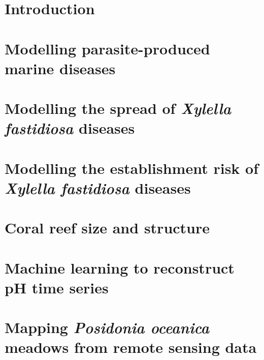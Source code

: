 \section{\label{sec:Introduction_3} Introduction}

\section{\label{sec:Modelling parasite-produced marine diseases} Modelling
  parasite-produced marine diseases}

\section{\label{sec:Modelling the spread of Xylella fastidiosa diseases}
  Modelling the spread of \textit{Xylella fastidiosa} diseases}

\section{\label{sec:Modelling the establishment risk of Xylella fastidiosa diseases}
  Modelling the establishment risk of \textit{Xylella fastidiosa} diseases}

\section{\label{sec:Coral reefs size and structure} Coral reef size and
  structure}

\section{\label{sec:Machine learning to reconstruct pH time series} Machine
  learning to reconstruct pH time series}

\section{\label{sec:Mapping Posidonia oceanica meadows from remote sensing
    data} Mapping \textit{Posidonia oceanica} meadows from remote sensing data}